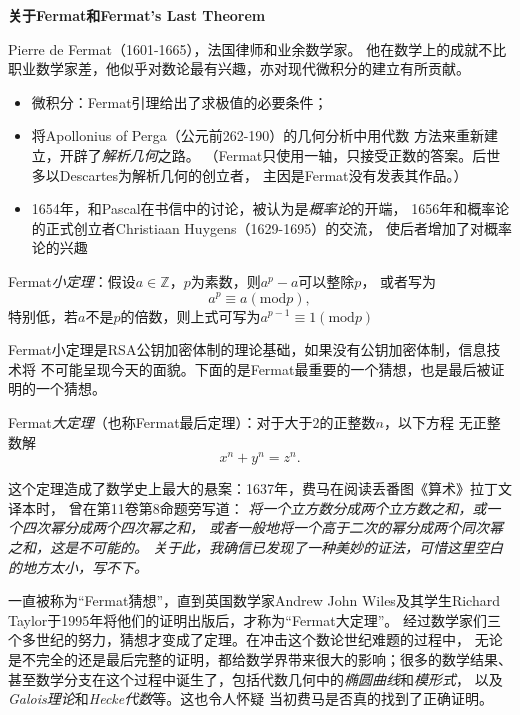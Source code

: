 \begin{shaded}
	{\bf 关于Fermat和Fermat's Last Theorem}
	
	Pierre de Fermat（1601-1665），法国律师和业余数学家。
	他在数学上的成就不比职业数学家差，他似乎对数论最有兴趣，亦对现代微积分的建立有所贡献。
	\begin{itemize}
	  \setlength{\itemindent}{1cm}
	  \item 微积分：Fermat引理给出了求极值的必要条件；
	  \item 将Apollonius of Perga（公元前262-190）的几何分析中用代数
	  方法来重新建立，开辟了{\it 解析几何}之路。
	  （Fermat只使用一轴，只接受正数的答案。后世多以Descartes为解析几何的创立者，
	  主因是Fermat没有发表其作品。）
	  \item 1654年，和Pascal在书信中的讨论，被认为是{\it 概率论}的开端，
	  1656年和概率论的正式创立者Christiaan Huygens（1629-1695）的交流，
	  使后者增加了对概率论的兴趣
	\end{itemize}
	
	\begin{tcolorbox}
		Fermat{\it 小定理}：假设$a\in\mathbb{Z}$，$p$为素数，则$a^p-a$可以整除$p$，
		或者写为
		$$a^p\equiv a(\mathrm{mod}p),$$
		特别低，若$a$不是$p$的倍数，则上式可写为$a^{p-1}\equiv 1(\mathrm{mod} p)$
	\end{tcolorbox}
	
	Fermat小定理是RSA公钥加密体制的理论基础，如果没有公钥加密体制，信息技术将
	不可能呈现今天的面貌。下面的是Fermat最重要的一个猜想，也是最后被证明的一个猜想。
	
	\begin{tcolorbox}
		Fermat{\it 大定理}（也称Fermat最后定理）：对于大于$2$的正整数$n$，以下方程
		无正整数解
		$$x^n+y^n=z^n.$$
	\end{tcolorbox}
	
	这个定理造成了数学史上最大的悬案：1637年，费马在阅读丢番图《算术》拉丁文译本时，
	曾在第11卷第8命题旁写道：
	{\it 将一个立方数分成两个立方数之和，或一个四次幂分成两个四次幂之和，
	或者一般地将一个高于二次的幂分成两个同次幂之和，这是不可能的。
	关于此，我确信已发现了一种美妙的证法，可惜这里空白的地方太小，写不下。}
	
	一直被称为“Fermat猜想”，直到英国数学家Andrew John Wiles及其学生Richard
	Taylor于1995年将他们的证明出版后，才称为“Fermat大定理”。
	经过数学家们三个多世纪的努力，猜想才变成了定理。在冲击这个数论世纪难题的过程中，
	无论是不完全的还是最后完整的证明，都给数学界带来很大的影响；很多的数学结果、
	甚至数学分支在这个过程中诞生了，包括代数几何中的{\it 椭圆曲线}和{\it 模形式}，
	以及{\it	Galois理论}和{\it Hecke代数}等。这也令人怀疑
	当初费马是否真的找到了正确证明。
	

\end{shaded}
